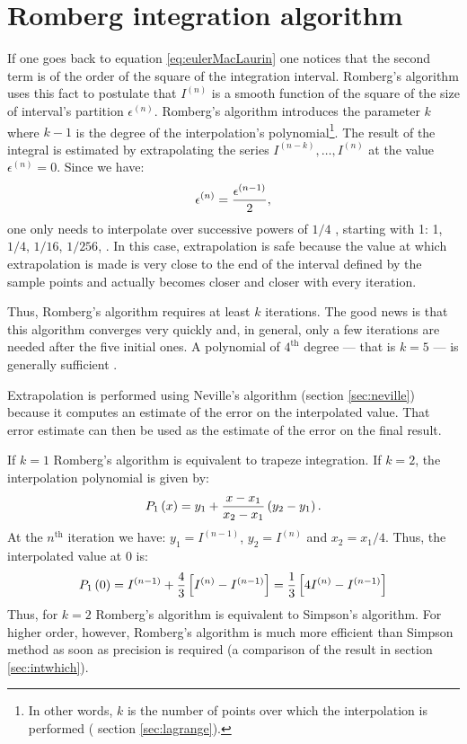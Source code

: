 \section{Romberg integration algorithm}
\label{sec:romberg}
If one goes back to equation \ref{eq:eulerMacLaurin} one notices that the second term is of the
order of the square of the integration interval. Romberg's
algorithm uses this fact to postulate that $I^{\left(n\right)}$ is
a smooth function of the square of the size of interval's
partition $\epsilon^{\left(n\right)}$. Romberg's algorithm
introduces the parameter $k$ where $k-1$ is the degree of the
interpolation's polynomial\footnote{In other words, $k$ is the
number of points over which the interpolation is performed (\cf
section \ref{sec:lagrange}).}. The result of the integral is
estimated by extrapolating the series
$I^{\left(n-k\right)},\ldots,I^{\left(n\right)}$ at the value
$\epsilon^{\left(n\right)}=0$. Since we have:
\begin{equation}
\epsilon^{\left(n\right)}={\epsilon^{\left(n-1\right)} \over 2},
\end{equation}
one only needs to interpolate over successive powers of $1/4$ ,
starting with 1: 1, $1/4$, $1/16$, $1/256$, \etc. In this case,
extrapolation is safe because the value at which extrapolation is
made is very close to the end of the interval defined by the
sample points and actually becomes closer and closer with every
iteration.

Thus, Romberg's algorithm requires at least $k$ iterations. The
good news is that this algorithm converges very quickly and, in
general, only a few iterations are needed after the five initial
ones. A polynomial of $4^{\mathop{\textrm{th}}}$ degree --- that is
$k=5$ --- is generally sufficient \cite{Press}.

Extrapolation is performed using Neville's algorithm (\cf section
\ref{sec:neville}) because it computes an estimate of the error on
the interpolated value. That error estimate can then be used as
the estimate of the error on the final result.

If $k=1$ Romberg's algorithm is equivalent to trapeze integration.
If $k=2$, the interpolation polynomial is given by:
\begin{equation}
P_1\left(x\right)=y_1+{x-x_1 \over x_2-x_1}\left(y_2-y_1\right).
\end{equation}
At the $n^{\mathop{\textrm{th}}}$ iteration we have:
$y_1=I^{\left(n-1\right)}$, $y_2=I^{\left(n\right)}$ and
$x_2=x_1/4$. Thus, the interpolated value at 0 is:
\begin{equation}
P_1\left(0\right)=I^{\left(n-1\right)}+{4 \over
3}\left[I^{\left(n\right)}-I^{\left(n-1\right)}\right] ={1\over
3}\left[4I^{\left(n\right)}-I^{\left(n-1\right)}\right]
\end{equation}
Thus, for $k=2$ Romberg's algorithm is equivalent to Simpson's
algorithm. For higher order, however, Romberg's algorithm is much
more efficient than Simpson method as soon as precision is
required (\cf a comparison of the result in section
\ref{sec:intwhich}).

